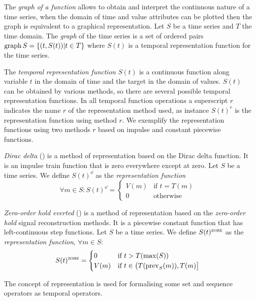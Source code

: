 The \emph{graph of a function} allows to obtain and interpret the
continuous nature of a time series, when the domain of time and value
attributes can be plotted then the graph is equivalent to a graphical
representation.  Let $S$ be a time series and $T$ the time domain. The
\emph{graph} of the time series is a set of ordered pairs $\operatorname*{graph} S =
\{ (t,S(t)) | t\in T \}$ where $S(t)$ is a temporal representation
function for the time series.

The \emph{temporal representation function} $S(t)$ is a continuous
function along variable $t$ in the domain of time and the target in
the domain of values. $S(t)$ can be obtained by various methods, so
there are several possible temporal representation functions. In all
temporal function operations a superscript $r$ indicates the name $r$
of the representation method used, as instance $S(t)^r$ is the
representation function using method $r$. We exemplify the
representation functions using two methods $r$ based on impulse and
constant piecewise functions.


\begin{definition}
  \emph{Dirac delta} (\dd) is a method of representation based on the
  Dirac delta function. It is an impulse train function that is zero
  everywhere except at zero.  Let $S$ be a time series. We define
  $S(t)^\dd$ as the \emph{\dd{} representation function}
\[
    \forall m \in S: S(t)^\dd
    =  \begin{cases}
      V(m) & \text{if }  t=T(m) \\
      0 & \text{otherwise}
    \end{cases}
\]
\end{definition}

\begin{definition}
  \emph{Zero-order hold everted} (\zohe{}) is a method of
  representation based on the \emph{zero-order hold} signal
  reconstruction methods. It is a piecewise constant function that has
  left-continuous step functions.  Let $S$ be a time series. We define
  $S(t)^\zohe$ as the \emph{\zohe{} representation function}, $\forall
  m \in S:$
\[
    S(t)^\zohe 
    = \begin{cases}
      0 & \text{if }  t > T(\max(S)) \\
      V(m) & \text{if } t\in \big(T(\prev_S(m)),T(m)\big]
    \end{cases}
\]
\end{definition}




The concept of representation is used for formalising some set and
sequence operators as temporal operators. 

